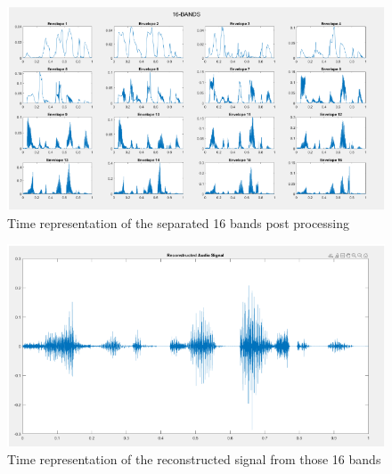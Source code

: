 \documentclass{article}
\begin{document}
\begin{figure}[!ht]
\includegraphics[width=\textwidth]{16_bands.png}
\caption{Time representation of the separated 16 bands post processing}
\label{fig:16b}
\end{figure}

\begin{figure}[!ht]
\includegraphics[width=\textwidth]{16br.png}
\caption{Time representation of the reconstructed signal from those 16 bands}
\label{fig:16br}
\end{figure}
\clearpage
\end{document}

